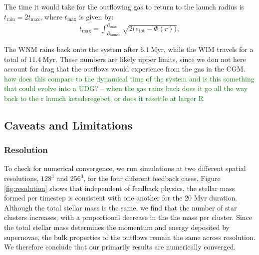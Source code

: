 \documentclass[twocolumn,linenumbers]{aastex631}
\begin{document}
{The time it would take for the outflowing gas to return to the launch radius is $t_\mathrm{rain} = 2t_\mathrm{max}$, where $t_\mathrm{max}$ is given by:
\begin{align}
t_\mathrm{max} = \int_{R_\mathrm{launch}}^{R_\mathrm{max}}\sqrt{2(e_\mathrm{tot} - \Phi(r)\bigr)},
\end{align}

The WNM rains back onto the system after $6.1\ \mathrm{Myr}$, while the WIM travels for a total of $11.4\ \mathrm{Myr}$. These numbers are likely upper limits, since we don not here account for drag that the outflows would experience from the gas in the CGM. \textcolor{green}{how does this compare to the dynamical time of the system and is this something that could evolve into a UDG? -- when the gas rains back does it go all the way back to the r launch ketederegebet, or does it resettle at larger R}



\subsection{Caveats and Limitations}
\subsubsection{Resolution}
To check for numerical convergence, we run simulations at two different spatial resolutions, $128^3$ and $256^3$, for the four different feedback cases. Figure \ref{fig:resolution} shows that independent of feedback physics,  the stellar mass formed per timestep is consistent with one another for the 20 Myr duration. Although the total stellar mass is the same, we find that the number of star clusters increases, with a proportional decrease in the the mass per cluster. Since the total stellar mass determines the momentum and energy deposited by supernovae, the bulk properties of the outflows remain the same across resolution. We therefore conclude that our primarily results are numerically converged.

}
\end{document}
